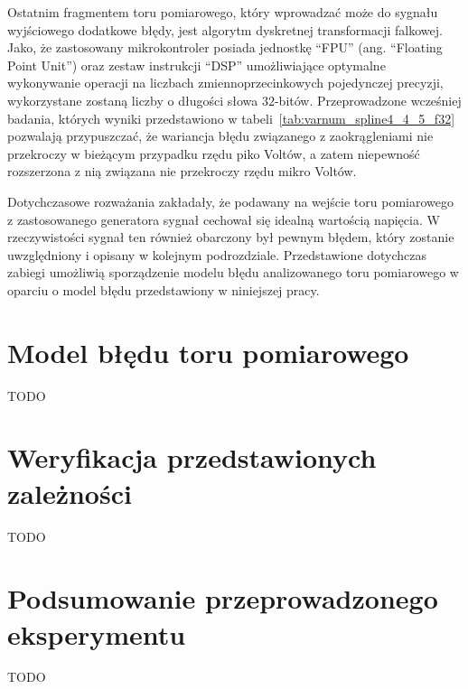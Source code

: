Ostatnim fragmentem toru pomiarowego, który wprowadzać może do sygnału wyjściowego dodatkowe błędy, jest algorytm dyskretnej transformacji falkowej. Jako, że zastosowany mikrokontroler posiada jednostkę \enquote{FPU} (ang. \enquote{Floating Point Unit}) oraz zestaw instrukcji \enquote{DSP} umożliwiające optymalne wykonywanie operacji na liczbach zmiennoprzecinkowych pojedynczej precyzji, wykorzystane zostaną liczby o długości słowa $32$-bitów. Przeprowadzone wcześniej badania, których wyniki przedstawiono w tabeli~\ref{tab:varnum_spline4_4_5_f32} pozwalają przypuszczać, że wariancja błędu związanego z zaokrągleniami nie przekroczy w bieżącym przypadku rzędu piko Voltów, a zatem niepewność rozszerzona z nią związana nie przekroczy rzędu mikro Voltów.

Dotychczasowe rozważania zakładały, że podawany na wejście toru pomiarowego z zastosowanego generatora sygnał cechował się idealną wartością napięcia. W rzeczywistości sygnał ten również obarczony był pewnym błędem, który zostanie uwzględniony i opisany w kolejnym podrozdziale. Przedstawione dotychczas zabiegi umożliwią sporządzenie modelu błędu analizowanego toru pomiarowego w oparciu o model błędu przedstawiony w niniejszej pracy.

\section{Model błędu toru pomiarowego}

TODO

\section{Weryfikacja przedstawionych zależności}

TODO

\section{Podsumowanie przeprowadzonego eksperymentu}

TODO

